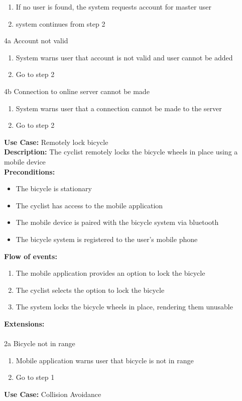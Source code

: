 \documentclass[a4paper]{report}
\begin{document}
\begin{enumerate}
\item If no user is found, the system requests account for master user
\item system continues from step 2
\end{enumerate}
4a Account not valid
\begin{enumerate}
\item System warns user that account is not valid and user cannot be added
\item Go to step 2
\end{enumerate}
4b Connection to online server cannot be made
\begin{enumerate}
\item System warns user that a connection cannot be made to the server
\item Go to step 2
\end{enumerate}
\textbf{Use Case:} Remotely lock bicycle \\
\textbf{Description:} The cyclist remotely locks the bicycle wheels in place using a mobile device\\
\textbf{Preconditions:} \begin{itemize}
\item The bicycle is stationary
\item The cyclist has access to the mobile application
\item The mobile device is paired with the bicycle system via bluetooth
\item The bicycle system is registered to the user's mobile phone
\end{itemize}
\textbf{Flow of events:} \begin{enumerate}
\item The mobile application provides an option to lock the bicycle
\item The cyclist selects the option to lock the bicycle
\item The system locks the bicycle wheels in place, rendering them unusable
\end{enumerate}
\textbf{Extensions:} \\\\
2a Bicycle not in range
\begin{enumerate}
\item Mobile application warns user that bicycle is not in range
\item Go to step 1
\end{enumerate}
\textbf{Use Case:} Collision Avoidance\\
\end{document}
